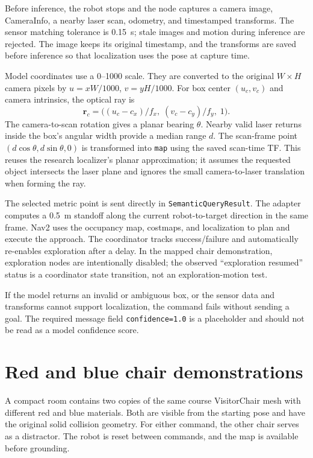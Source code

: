 \documentclass[10pt,letterpaper]{article}
\newcommand{\code}[1]{\texttt{#1}}
\begin{document}
Before inference, the robot stops and the node captures a camera image, CameraInfo, a nearby laser scan, odometry, and timestamped transforms. The sensor matching tolerance is 0.15~s; stale images and motion during inference are rejected. The image keeps its original timestamp, and the transforms are saved before inference so that localization uses the pose at capture time.

Model coordinates use a 0--1000 scale. They are converted to the original $W\times H$ camera pixels by $u=xW/1000$, $v=yH/1000$. For box center $(u_c,v_c)$ and camera intrinsics, the optical ray is
\[
\mathbf r_c=\big((u_c-c_x)/f_x,\;(v_c-c_y)/f_y,\;1\big).
\]
The camera-to-scan rotation gives a planar bearing $\theta$. Nearby valid laser returns inside the box's angular width provide a median range $d$. The scan-frame point $(d\cos\theta,d\sin\theta,0)$ is transformed into \code{map} using the saved scan-time TF. This reuses the research localizer's planar approximation; it assumes the requested object intersects the laser plane and ignores the small camera-to-laser translation when forming the ray.

The selected metric point is sent directly in \code{SemanticQueryResult}. The adapter computes a 0.5~m standoff along the current robot-to-target direction in the same frame. Nav2 uses the occupancy map, costmaps, and localization to plan and execute the approach. The coordinator tracks success/failure and automatically re-enables exploration after a delay. In the mapped chair demonstration, exploration nodes are intentionally disabled; the observed ``exploration resumed'' status is a coordinator state transition, not an exploration-motion test.

If the model returns an invalid or ambiguous box, or the sensor data and transforms cannot support localization, the command fails without sending a goal. The required message field \code{confidence=1.0} is a placeholder and should not be read as a model confidence score.

\newpage
\section{Red and blue chair demonstrations}
A compact room contains two copies of the same course VisitorChair mesh with different red and blue materials. Both are visible from the starting pose and have the original solid collision geometry. For either command, the other chair serves as a distractor. The robot is reset between commands, and the map is available before grounding.
\end{document}
